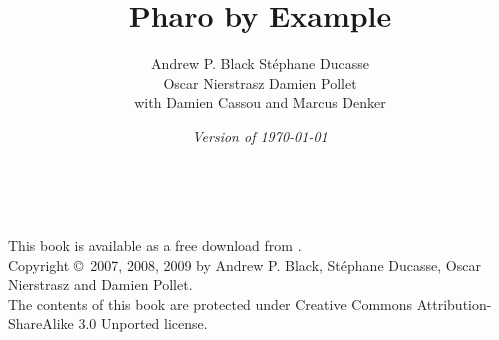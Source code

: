 \documentclass[a4paper,10pt,twoside]{book}
\begin{document}
\frontmatter
\setcounter{page}{1}
\pagestyle{headings}
\author{
	Andrew P. Black\quad
	St\'ephane Ducasse\\[1ex]
	Oscar Nierstrasz\quad
	Damien Pollet
	\\[4ex]
	with Damien Cassou and Marcus Denker}
\title{\Huge\bf Pharo by Example}
\isodate
\date{\emph{Version of \today}}
\maketitle
~ %
\vfill
\begin{footnotesize}
\setlength{\parindent}{0pt}
This book is available as a free download from \pbe.\\[1cm]

Copyright \copyright~2007, 2008, 2009 by Andrew P. Black, St\'ephane Ducasse, Oscar Nierstrasz and Damien Pollet.\\[1cm]

The contents of this book are protected under Creative Commons Attribution-ShareAlike 3.0 Unported license.


\end{footnotesize}
\end{document}
